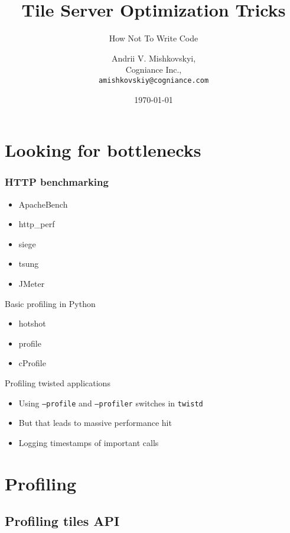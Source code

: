 \documentclass[16pt]{beamer}
\title{Tile Server Optimization Tricks}
\subtitle{How Not To Write Code}
\author{Andrii V. Mishkovskyi,\\
  Cogniance Inc.,\\
  \texttt{amishkovskiy@cogniance.com}}
\date{\today}
\begin{document}
\begin{frame}
  \titlepage
\end{frame}

\begin{frame}
  \tableofcontents
\end{frame}

\section{Looking for bottlenecks}

\begin{frame}
  \frametitle{HTTP benchmarking}
  \begin{itemize}
  \item ApacheBench
  \item http\_perf
  \item siege
  \item tsung
  \item JMeter
  \end{itemize}
\end{frame}

\begin{frame}{Basic profiling in Python}
  \begin{itemize}
  \item hotshot
  \item profile
  \item cProfile
  \end{itemize}
\end{frame}

\begin{frame}{Profiling twisted applications}
  \begin{itemize}
  \item Using \texttt{--profile} and \texttt{--profiler}
    switches in \texttt{twistd}
  \item But that leads to massive performance hit
  \item Logging timestamps of important calls
  \end{itemize}
\end{frame}

\section{Profiling}

\subsection{Profiling tiles API}
\end{document}
